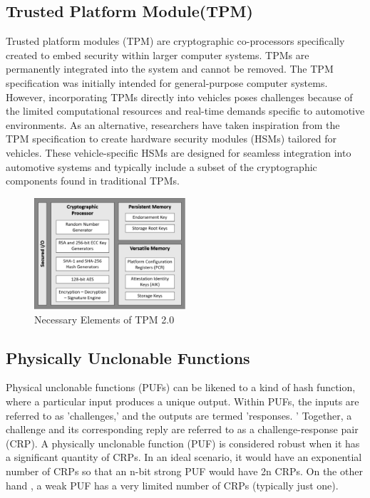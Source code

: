 \documentclass[conference]{IEEEtran}
\begin{document}
\subsection{Trusted Platform Module(TPM)}
Trusted platform modules (TPM) are cryptographic co-processors specifically created to embed security within larger computer systems. TPMs are permanently integrated into the system and cannot be removed. The TPM specification was initially intended for general-purpose computer systems. However, incorporating TPMs directly into vehicles poses challenges because of the limited computational resources and real-time demands specific to automotive environments. As an alternative, researchers have taken inspiration from the TPM specification to create hardware security modules (HSMs) tailored for vehicles. These vehicle-specific HSMs are designed for seamless integration into automotive systems and typically include a subset of the cryptographic components found in traditional TPMs.
\begin{figure}[htbp]
\centerline{\includegraphics[width=0.5\textwidth]{TPM.eps}}
\caption{Necessary Elements of TPM 2.0}
\label{fig}
\end{figure}
\subsection{Physically Unclonable Functions}
Physical unclonable functions (PUFs) can be likened to a kind of hash function, where a particular input produces a unique output. Within PUFs, the inputs are referred to as 'challenges,' and the outputs are termed 'responses. '\cite{labrado2019hardware}
Together, a challenge and its corresponding reply are referred to as a challenge-response pair (CRP). A physically unclonable function (PUF) is considered robust when it has a significant quantity of CRPs. In an ideal scenario, it would have an exponential number of CRPs so that an n-bit strong PUF would have 2n CRPs. On the other hand , a weak PUF has a very limited number of CRPs (typically just one).\cite{oriero2019survey}
\end{document}
